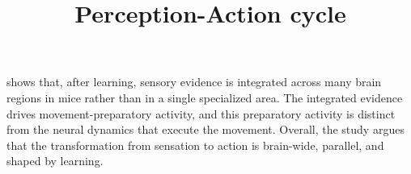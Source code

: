 \documentclass[a4paper]{article}
\title{Perception-Action cycle}
\date{}
\begin{document}
    \maketitle
    \cite{khilkevich-2024-brain-wide-dynamics-linking-sensation-to-action-during-decision-making}  shows that, after learning, sensory evidence is integrated across many brain regions in mice rather than in a single specialized area. The integrated evidence drives movement-preparatory activity, and this preparatory activity is distinct from the neural dynamics that execute the movement. Overall, the study argues that the transformation from sensation to action is brain-wide, parallel, and shaped by learning.
    
    
\end{document}
